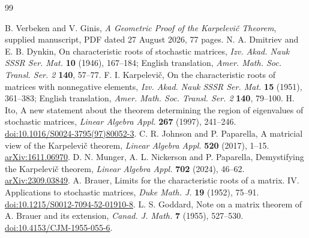 \documentclass[11pt,a4paper]{article}
\theoremstyle{definition}
\theoremstyle{remark}
\numberwithin{equation}{section}
\begin{document}
\begin{thebibliography}{99}
\raggedright
{} B. Verbeken and V. Ginis,
\emph{A Geometric Proof of the Karpelevi\v{c} Theorem}, supplied manuscript,
PDF dated 27 August 2026, 77 pages.
 N. A. Dmitriev and E. B. Dynkin,
On characteristic roots of stochastic matrices,
\emph{Izv. Akad. Nauk SSSR Ser. Mat.} \textbf{10} (1946), 167--184;
English translation, \emph{Amer. Math. Soc. Transl. Ser. 2} \textbf{140}, 57--77.
 F. I. Karpelevi\v{c},
On the characteristic roots of matrices with nonnegative elements,
\emph{Izv. Akad. Nauk SSSR Ser. Mat.} \textbf{15} (1951), 361--383;
English translation, \emph{Amer. Math. Soc. Transl. Ser. 2} \textbf{140}, 79--100.
 H. Ito,
A new statement about the theorem determining the region of eigenvalues of stochastic matrices,
\emph{Linear Algebra Appl.} \textbf{267} (1997), 241--246.
\href{https://doi.org/10.1016/S0024-3795(97)80052-3}{doi:10.1016/S0024-3795(97)80052-3}.
 C. R. Johnson and P. Paparella,
A matricial view of the Karpelevi\v{c} theorem,
\emph{Linear Algebra Appl.} \textbf{520} (2017), 1--15.
\href{https://arxiv.org/abs/1611.06970}{arXiv:1611.06970}.
 D. N. Munger, A. L. Nickerson and P. Paparella,
Demystifying the Karpelevi\v{c} theorem,
\emph{Linear Algebra Appl.} \textbf{702} (2024), 46--62.
\href{https://arxiv.org/abs/2309.03849}{arXiv:2309.03849}.
 A. Brauer,
Limits for the characteristic roots of a matrix. IV. Applications to stochastic matrices,
\emph{Duke Math. J.} \textbf{19} (1952), 75--91.
\href{https://doi.org/10.1215/S0012-7094-52-01910-8}{doi:10.1215/S0012-7094-52-01910-8}.
 L. S. Goddard,
Note on a matrix theorem of A. Brauer and its extension,
\emph{Canad. J. Math.} \textbf{7} (1955), 527--530.
\href{https://doi.org/10.4153/CJM-1955-055-6}{doi:10.4153/CJM-1955-055-6}.


\end{thebibliography}
\end{document}
